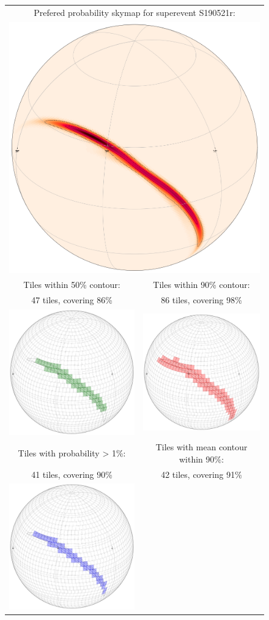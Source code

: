 \begin{colsection}
\begin{colsection}
\newpage

\begin{figure}[p]
    \begin{center}
        \begin{tabular}{cc}
            \multicolumn{2}{c}{Prefered probability skymap for superevent S190521r:} \\ %
            \multicolumn{2}{c}{\includegraphics[width=0.5\linewidth]{images/tiling/1_0.png}} \\
            Tiles within 50\% contour: &
            Tiles within 90\% contour: \\
            47 tiles, covering 86\% &
            86 tiles, covering 98\% \\
            \includegraphics[width=0.25\linewidth]{images/tiling/1_c.png} &
            \includegraphics[width=0.25\linewidth]{images/tiling/1_d.png} \\
            Tiles with probability > 1\%: &
            Tiles with mean contour within 90\%: \\
            41 tiles, covering 90\% &
            42 tiles, covering 91\% \\
            \includegraphics[width=0.25\linewidth]{images/tiling/1_a.png} &

\end{tabular}
\end{center}
\end{figure}
\end{colsection}
\end{colsection}
